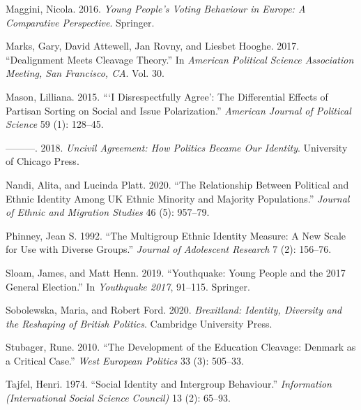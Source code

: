\documentclass[a4paper]{cupjournal}
\newenvironment{CSLReferences}%
  {}%
  {\par}
\begin{document}
\begin{CSLReferences}{1}{0}
\leavevmode{}%
Maggini, Nicola. 2016. \emph{Young People's Voting Behaviour in {Europe}: {A} Comparative Perspective}. {Springer}.

\leavevmode{}%
Marks, Gary, David Attewell, Jan Rovny, and Liesbet Hooghe. 2017. {``Dealignment Meets Cleavage Theory.''} In \emph{American Political Science Association Meeting, San Francisco, {CA}}. Vol. 30.

\leavevmode{}%
Mason, Lilliana. 2015. {``{`{I} Disrespectfully Agree'}: {The} Differential Effects of Partisan Sorting on Social and Issue Polarization.''} \emph{American Journal of Political Science} 59 (1): 128--45.

\leavevmode{}%
---------. 2018. \emph{Uncivil Agreement: {How} Politics Became Our Identity}. {University of Chicago Press}.

\leavevmode{}%
Nandi, Alita, and Lucinda Platt. 2020. {``The Relationship Between Political and Ethnic Identity Among {UK} Ethnic Minority and Majority Populations.''} \emph{Journal of Ethnic and Migration Studies} 46 (5): 957--79.

\leavevmode{}%
Phinney, Jean S. 1992. {``The Multigroup Ethnic Identity Measure: {A} New Scale for Use with Diverse Groups.''} \emph{Journal of Adolescent Research} 7 (2): 156--76.

\leavevmode{}%
Sloam, James, and Matt Henn. 2019. {``Youthquake: {Young People} and the 2017 {General Election}.''} In \emph{Youthquake 2017}, 91--115. {Springer}.

\leavevmode{}%
Sobolewska, Maria, and Robert Ford. 2020. \emph{Brexitland: {Identity}, Diversity and the Reshaping of British Politics}. {Cambridge University Press}.

\leavevmode{}%
Stubager, Rune. 2010. {``The Development of the Education Cleavage: {Denmark} as a Critical Case.''} \emph{West European Politics} 33 (3): 505--33.

\leavevmode{}%
Tajfel, Henri. 1974. {``Social Identity and Intergroup Behaviour.''} \emph{Information (International Social Science Council)} 13 (2): 65--93.


\end{CSLReferences}
\end{document}
